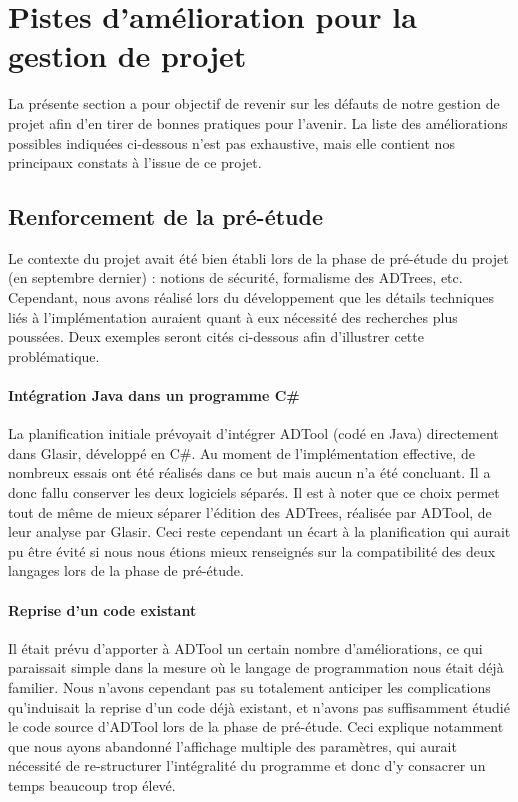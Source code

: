 \section{Pistes d'amélioration pour la gestion de projet}
\label{sec:plusMieux}

La présente section a pour objectif de revenir sur les défauts de notre gestion de projet afin d'en tirer de bonnes pratiques pour l'avenir. La liste des améliorations possibles indiquées ci-dessous n'est pas exhaustive, mais elle contient nos principaux constats à l'issue de ce projet.

\subsection{Renforcement de la pré-étude}
\label{ssec:pre-etude}

Le contexte du projet avait été bien établi lors de la phase de pré-étude du projet (en septembre dernier) : notions de sécurité, formalisme des ADTrees, etc. Cependant, nous avons réalisé lors du développement que les détails techniques liés à l'implémentation auraient quant à eux nécessité des recherches plus poussées. Deux exemples seront cités ci-dessous afin d'illustrer cette problématique.

\paragraph{Intégration Java dans  un programme C\#} La planification initiale prévoyait d'intégrer ADTool (codé en Java) directement dans Glasir, développé en C\#. Au moment de l'implémentation effective, de nombreux essais ont été réalisés dans ce but mais aucun n'a été concluant. Il a donc fallu conserver les deux logiciels séparés. Il est à noter que ce choix permet tout de même de mieux séparer l'édition des ADTrees, réalisée par ADTool, de leur analyse par Glasir. Ceci reste cependant un écart à la planification qui aurait pu être évité si nous nous étions mieux renseignés sur la compatibilité des deux langages lors de la phase de pré-étude.

\paragraph{Reprise d'un code existant} Il était prévu d'apporter à ADTool un certain nombre d'améliorations, ce qui paraissait simple dans la mesure où le langage de programmation nous était déjà familier. Nous n'avons cependant pas su totalement anticiper les complications qu'induisait la reprise d'un code déjà existant, et n'avons pas suffisamment étudié le code source d'ADTool lors de la phase de pré-étude. Ceci explique notamment que nous ayons abandonné l'affichage multiple des paramètres, qui aurait nécessité de re-structurer l'intégralité du programme et donc d'y consacrer un temps beaucoup trop élevé.

